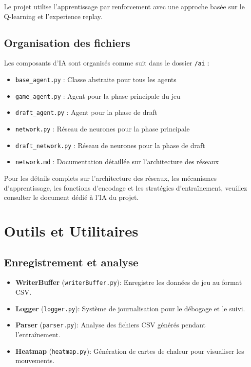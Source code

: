 \documentclass[]{article}
\begin{document}
Le projet utilise l'apprentissage par renforcement avec une approche basée sur le Q-learning et l'experience replay.

\subsection{Organisation des fichiers}
Les composants d'IA sont organisés comme suit dans le dossier \texttt{/ai} :
\begin{itemize}
  \item \texttt{base\_agent.py} : Classe abstraite pour tous les agents
  \item \texttt{game\_agent.py} : Agent pour la phase principale du jeu
  \item \texttt{draft\_agent.py} : Agent pour la phase de draft
  \item \texttt{network.py} : Réseau de neurones pour la phase principale
  \item \texttt{draft\_network.py} : Réseau de neurones pour la phase de draft
  \item \texttt{network.md} : Documentation détaillée sur l'architecture des réseaux
\end{itemize}

Pour les détails complets sur l'architecture des réseaux, les mécanismes d'apprentissage, les fonctions d'encodage et les stratégies d'entraînement, veuillez consulter le document dédié à l'IA du projet.

\section{Outils et Utilitaires}

\subsection{Enregistrement et analyse}
\begin{itemize}
  \item \textbf{WriterBuffer} (\texttt{writerBuffer.py}): Enregistre les données de jeu au format CSV.
  \item \textbf{Logger} (\texttt{logger.py}): Système de journalisation pour le débogage et le suivi.
  \item \textbf{Parser} (\texttt{parser.py}): Analyse des fichiers CSV générés pendant l'entraînement.
  \item \textbf{Heatmap} (\texttt{heatmap.py}): Génération de cartes de chaleur pour visualiser les mouvements.
\end{itemize}
\end{document}
